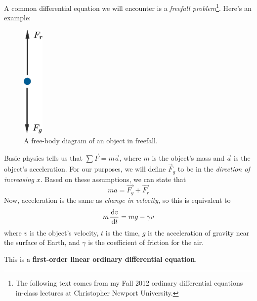 A common differential equation we will encounter is a \emph{freefall problem}\footnote{The following text comes from my Fall 2012 ordinary differential equations in-class lectures at Christopher Newport University.}.
Here's an example:

\begin{figure}[H]
  \begin{center}
    \includegraphics[width=1cm]{continuous/ode/freefall.eps}
  \end{center}
  \caption{A free-body diagram of an object in freefall.}
  \label{fig:freefall}
\end{figure}

Basic physics tells us that $\sum \vec F = m\vec a$,
where $m$ is the object's mass and $\vec{a}$ is the object's acceleration.
For our purposes, we will define $\vec F_g$ to be in the \emph{direction of increasing} $x$.
Based on these assumptions, we can state that
\[
  ma=\vec{F_g}+\vec{F_r}
  \]
Now, acceleration is the same as \emph{change in velocity,} so this is equivalent to
\[
  m\frac{\,\mathrm{d} v}{\,\mathrm{d} t}=mg - \gamma v
  \]
where $v$ is the object's velocity, $t$ is the time, $g$ is the acceleration of gravity near the surface of Earth, and $\gamma$ is the coefficient of friction for the air.

This is a \textbf{first-order linear ordinary differential equation}.


